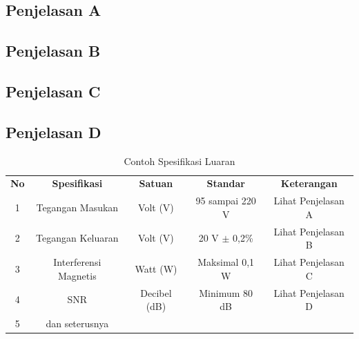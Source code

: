     \subsection{Penjelasan A}
    \label{subsec:Ch06_penjelasan_A}
    
    \lipsum[5]

    \subsection{Penjelasan B}
    \label{subsec:Ch06_penjelasan_A}
    
    \lipsum[5]

    \subsection{Penjelasan C}
    \label{subsec:Ch06_penjelasan_A}
    
    \lipsum[5]

    \subsection{Penjelasan D}
    \label{subsec:Ch06_penjelasan_A}
    
    \lipsum[5]
    
    \begin{longtable}{|c|c|c|c|c|}
        \caption{Contoh Spesifikasi Luaran} 
        \label{tab:Ch06_Contoh_Spesifikasi_Luaran}
        \vspace{-0.75em}\\
        \hline
        \textbf{No} & \textbf{Spesifikasi}  & \textbf{Satuan} & \textbf{Standar} & \textbf{Keterangan} \\ \hline
        1           & Tegangan Masukan      & Volt (V)        & 95 sampai 220 V  & Lihat Penjelasan A  \\ \hline
        2           & Tegangan Keluaran     & Volt (V)        & 20 V $\pm$ 0,2\% & Lihat Penjelasan B  \\ \hline
        3           & Interferensi Magnetis & Watt (W)        & Maksimal 0,1 W   & Lihat Penjelasan C  \\ \hline
        4           & SNR                   & Decibel (dB)    & Minimum 80 dB    & Lihat Penjelasan D  \\ \hline
        5           & dan seterusnya        &                 &                  &                     \\ \hline
    \end{longtable}
    
  